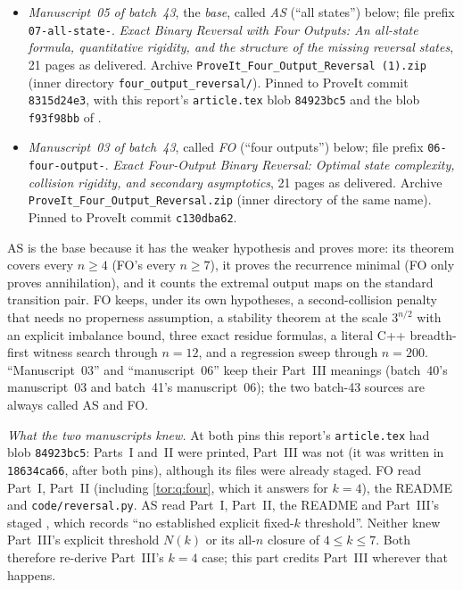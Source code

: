\documentclass[11pt,a4paper]{article}
\numberwithin{equation}{section}
\theoremstyle{definition}
\theoremstyle{remark}
\begin{document}
\begin{itemize}
\item \emph{Manuscript~05 of batch~43}, the \emph{base}, called \emph{AS}
(``all states'') below; file prefix \texttt{07-all-state-}. \emph{Exact
Binary Reversal with Four Outputs: An all-state formula, quantitative
rigidity, and the structure of the missing reversal states}, 21 pages as
delivered. Archive
\texttt{ProveIt\_\allowbreak Four\_\allowbreak Output\_\allowbreak Reversal\allowbreak\ (1).zip}
(inner directory \texttt{four\_\allowbreak output\_\allowbreak reversal/}).
Pinned to ProveIt commit \texttt{8315d24e3}, with this report's
\texttt{article.tex} blob \texttt{84923bc5} and the blob \texttt{f93f98bb} of
.
\item \emph{Manuscript~03 of batch~43}, called \emph{FO} (``four outputs'')
below; file prefix \texttt{06-four-output-}. \emph{Exact Four-Output Binary
Reversal: Optimal state complexity, collision rigidity, and secondary
asymptotics}, 21 pages as delivered. Archive
\texttt{ProveIt\_\allowbreak Four\_\allowbreak Output\_\allowbreak Reversal.zip}
(inner directory of the same name). Pinned to ProveIt commit
\texttt{c130dba62}.
\end{itemize}

AS is the base because it has the weaker hypothesis and proves more: its
theorem covers every $n\ge4$ (FO's every $n\ge7$), it proves the recurrence
minimal (FO only proves annihilation), and it counts the extremal output maps
on the standard transition pair. FO keeps, under its own hypotheses, a
second-collision penalty that needs no properness assumption, a stability
theorem at the scale $3^{n/2}$ with an explicit imbalance bound, three exact
residue formulas, a literal C++ breadth-first witness search through $n=12$,
and a regression sweep through $n=200$. ``Manuscript~03'' and
``manuscript~06'' keep their Part~III meanings (batch~40's manuscript~03 and
batch~41's manuscript~06); the two batch-43 sources are always called AS and
FO.

\emph{What the two manuscripts knew.} At both pins this report's
\texttt{article.tex} had blob \texttt{84923bc5}: Parts~I and~II were printed,
Part~III was not (it was written in \texttt{18634ca66}, after both pins),
although its files were already staged. FO read Part~I, Part~II (including
\cref{tor:q:four}, which it answers for $k=4$), the README and
\texttt{code/reversal.py}. AS read Part~I, Part~II, the README and Part~III's
staged , which records ``no established
explicit fixed-$k$ threshold''. Neither knew Part~III's explicit threshold
$N(k)$ or its all-$n$ closure of $4\le k\le7$. Both therefore re-derive
Part~III's $k=4$ case; this part credits Part~III wherever that happens.
\end{document}
